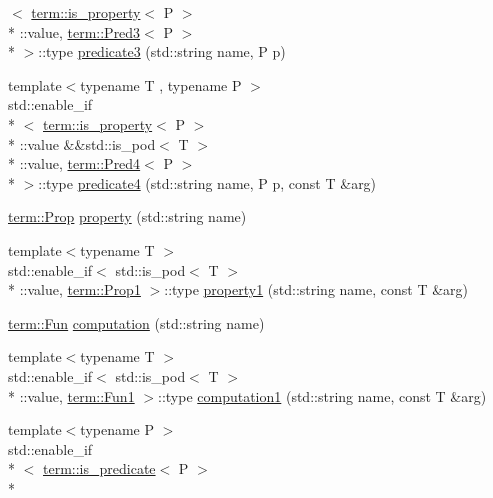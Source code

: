 \begin{DoxyCompactItemize}
$<$ \hyperlink{structpfq__lang_1_1term_1_1is__property}{term\-::is\-\_\-property}$<$ P $>$\\*
\-::value, \hyperlink{structpfq__lang_1_1term_1_1Pred3}{term\-::\-Pred3}$<$ P $>$\\*
 $>$\-::type \hyperlink{namespacepfq__lang_a863e349ba4942bf8a01b61d91859164a}{predicate3} (std\-::string name, P p)
\item 
{\footnotesize template$<$typename T , typename P $>$ }\\std\-::enable\-\_\-if\\*
$<$ \hyperlink{structpfq__lang_1_1term_1_1is__property}{term\-::is\-\_\-property}$<$ P $>$\\*
\-::value \&\&std\-::is\-\_\-pod$<$ T $>$\\*
\-::value, \hyperlink{structpfq__lang_1_1term_1_1Pred4}{term\-::\-Pred4}$<$ P $>$\\*
 $>$\-::type \hyperlink{namespacepfq__lang_a1a9064340f4197e3dd4109a849a224dc}{predicate4} (std\-::string name, P p, const T \&arg)
\item 
\hyperlink{structpfq__lang_1_1term_1_1Prop}{term\-::\-Prop} \hyperlink{namespacepfq__lang_ad70b40071ed0fd32c05ab8e82bbfec61}{property} (std\-::string name)
\item 
{\footnotesize template$<$typename T $>$ }\\std\-::enable\-\_\-if$<$ std\-::is\-\_\-pod$<$ T $>$\\*
\-::value, \hyperlink{structpfq__lang_1_1term_1_1Prop1}{term\-::\-Prop1} $>$\-::type \hyperlink{namespacepfq__lang_a3a4768b9f4e03b86943d332254cca27e}{property1} (std\-::string name, const T \&arg)
\item 
\hyperlink{structpfq__lang_1_1term_1_1Fun}{term\-::\-Fun} \hyperlink{namespacepfq__lang_ac0c16097c968653e72c609890dfb4c44}{computation} (std\-::string name)
\item 
{\footnotesize template$<$typename T $>$ }\\std\-::enable\-\_\-if$<$ std\-::is\-\_\-pod$<$ T $>$\\*
\-::value, \hyperlink{structpfq__lang_1_1term_1_1Fun1}{term\-::\-Fun1} $>$\-::type \hyperlink{namespacepfq__lang_a58e7e358fc7c95121f74d56c094b1627}{computation1} (std\-::string name, const T \&arg)
\item 
{\footnotesize template$<$typename P $>$ }\\std\-::enable\-\_\-if\\*
$<$ \hyperlink{structpfq__lang_1_1term_1_1is__predicate}{term\-::is\-\_\-predicate}$<$ P $>$\\*

\end{DoxyCompactItemize}
